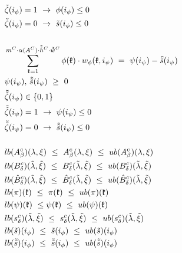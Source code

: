 \documentclass{article}
\begin{document}
\begin{align}
& \tilde{\zeta}(i_\phi) = 1  \ \to \ \phi(i_\phi) \leq 0 \label{const_fullyconnect_relu_98} \\
& \tilde{\zeta}(i_\phi) = 0  \ \to \ \tilde{s}(i_\phi) \leq 0 \label{const_fullyconnect_relu_99}\\
\notag \\
&\sum_{\mathfrak{k}=1}^{m^{C}\cdot \alpha(A^{C}) \cdot \tilde{\tilde{h}}^{C} \cdot \tilde{\tilde{w}}^{C}} \phi(\mathfrak{k}) \cdot w_\phi (\mathfrak{k}, i_\psi) \ = \ \psi(i_\psi) - \tilde{\tilde{s}}(i_\psi) \label{const_output_100} \\
& \psi(i_\psi), \, \tilde{\tilde{s}}(i_\psi) \ \geq \ 0 \label{const_output_101} \\
& \tilde{\tilde{\zeta}}(i_\psi) \in \{ 0,1 \} \label{const_output_102}\\
& \tilde{\tilde{\zeta}}(i_\psi) = 1  \ \to \ \psi(i_\psi) \leq 0 \label{const_output_103}\\
& \tilde{\tilde{\zeta}}(i_\psi) = 0  \ \to \ \tilde{\tilde{s}}(i_\psi) \leq 0  \label{const_output_104}\\
\notag \\
&lb(A_\beta^c)(\lambda, \xi) \ \leq \ A_\beta^c(\lambda,\xi) \ \leq \ ub(A_\beta^c)(\lambda, \xi) \label{const_bounds_105} \\
&lb(B_\delta^c)(\tilde{\lambda}, \tilde{\xi}) \ \leq \ B_\delta^c(\tilde{\lambda}, \tilde{\xi}) \ \leq \ ub(B_\delta^c)(\tilde{\lambda}, \tilde{\xi}) \label{const_bounds_106} \\
&lb(\hat{B}_\delta^c)(\tilde{\lambda}, \tilde{\xi}) \ \leq \ \hat{B}_\delta^c(\tilde{\lambda}, \tilde{\xi}) \ \leq \ ub(\hat{B}_\delta^c)(\tilde{\lambda}, \tilde{\xi}) \label{const_bounds_107} \\ 
&lb(\pi)(\mathfrak{k}) \ \leq \ \pi(\mathfrak{k}) \ \leq \ ub(\pi)(\mathfrak{k}) \label{const_bounds_108}\\
&lb(\psi)(\mathfrak{k}) \ \leq \psi(\mathfrak{k}) \ \leq \ ub(\psi)(\mathfrak{k}) \label{const_bounds_109} \\
&lb(s_\delta^c)(\tilde{\lambda}, \tilde{\xi}) \ \leq \ s_\delta^c(\tilde{\lambda}, \tilde{\xi}) \ \leq \ ub(s_\delta^c)(\tilde{\lambda}, \tilde{\xi}) \label{const_bounds_110}\\
&lb(\tilde{s})(i_\phi) \ \leq \ \tilde{s}(i_\phi) \ \leq \ ub(\tilde{s})(i_\phi) \label{const_bounds_111}\\
&lb(\tilde{\tilde{s}})(i_\phi) \ \leq \ \tilde{\tilde{s}}(i_\phi) \ \leq \ ub(\tilde{\tilde{s}})(i_\phi) \label{const_bounds_112} \\

\end{align}
\end{document}
